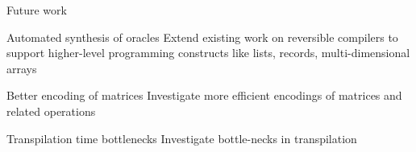 \documentclass[10pt]{beamer}
\begin{document}
\begin{frame}{Future work}
  \begin{exampleblock}{Automated synthesis of oracles}
    Extend existing work on reversible compilers to support higher-level
    programming constructs like lists, records, multi-dimensional arrays
  \end{exampleblock}
  \begin{exampleblock}{Better encoding of matrices}
    Investigate more efficient encodings of matrices and related operations
  \end{exampleblock}
  \begin{exampleblock}{Transpilation time bottlenecks}
    Investigate bottle-necks in transpilation
  \end{exampleblock}
\end{frame}
\end{document}
